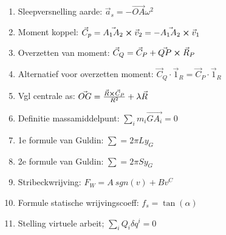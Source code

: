 \documentclass[12pt]{article}
\begin{document}
\begin{enumerate}
	    \item Sleepversnelling aarde: $ \vec{a}_s = -\vec{OA} \omega^2 $
	    \item Moment koppel: $ \vec{C}_p = \vec{A_1 A_2} \cross \vec{v}_2 = -\vec{A_1 A_2} \cross \vec{v}_1$
	    \item Overzetten van moment: $ \vec{C}_Q = \vec{C}_P + \vec{QP} \cross \vec{R}_P $
	    \item Alternatief voor overzetten moment: $ \vec{C}_Q \cdot \vec{1}_R = \vec{C}_P \cdot \vec{1}_R $
	    \item Vgl centrale as: $ \vec{OG} = \frac{\vec{R}\cross\vec{C}_P}{R^2} + \lambda \vec{R} $
	    \item Definitie massamiddelpunt: $ \sum\limits_i m_i \vec{GA_i} = 0 $
	    \item 1e formule van Guldin: $ \sum = 2\pi L y_G $
	    \item 2e formule van Guldin: $ \sum = 2\pi S y_G $
	    \item Stribeckwrijving: $ F_W = A\ sgn{(v)} + B v^C $
	    \item Formule statische wrijvingscoeff: $ f_s = \tan{(\alpha)} $
	    \item Stelling virtuele arbeit; $ \sum\limits_i Q_i \delta q^i = 0 $
    \end{enumerate}
    
\end{document}

